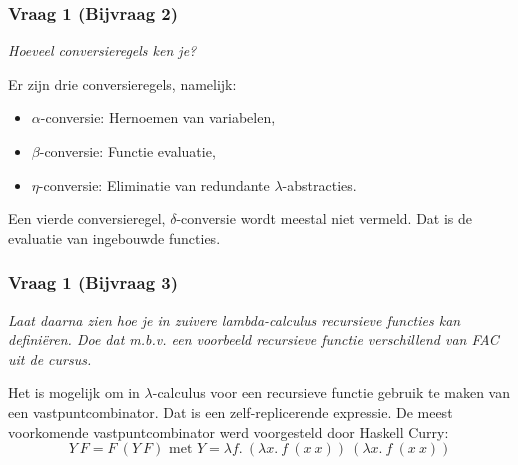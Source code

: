 \subsubsection{Vraag 1 (Bijvraag 2)}

\textit{Hoeveel conversieregels ken je?}

Er zijn drie conversieregels, namelijk:

\begin{itemize}
\item $\alpha$-conversie: Hernoemen van variabelen,
\item $\beta$-conversie: Functie evaluatie,
\item $\eta$-conversie: Eliminatie van redundante $\lambda$-abstracties.
\end{itemize}

Een vierde conversieregel, $\delta$-conversie wordt meestal niet vermeld. Dat is de evaluatie van ingebouwde functies.

\subsubsection{Vraag 1 (Bijvraag 3)}

\textit{Laat daarna zien hoe je in zuivere lambda-calculus recursieve functies kan defini\"eren. Doe dat m.b.v. een voorbeeld recursieve functie verschillend van FAC uit de cursus.}

Het is mogelijk om in $\lambda$-calculus voor een recursieve functie gebruik te maken van een vastpuntcombinator. Dat is een zelf-replicerende expressie. De meest voorkomende vastpuntcombinator werd voorgesteld door Haskell Curry:
\begin{equation*}
  Y\ F = F\ (Y\ F) \text{ met } Y = \lambda f.\ (\lambda x.\ f\ (x\ x))\ (\lambda x.\ f\ (x\ x))
\end{equation*}

